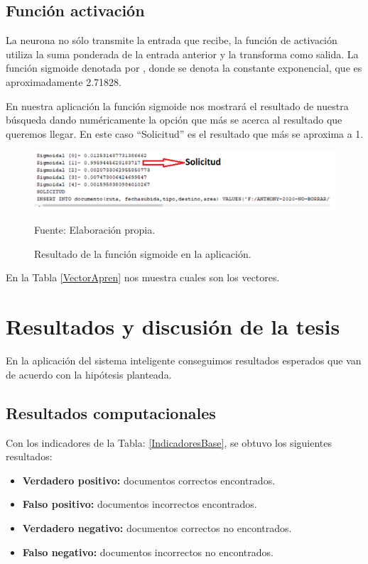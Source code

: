 \section{Función activación}
La neurona no sólo transmite la entrada que recibe, la función de activación utiliza la suma ponderada de la entrada anterior y la transforma como salida. La función sigmoide denotada por , donde se denota la constante exponencial, que es aproximadamente 2.71828.

En nuestra aplicación la función sigmoide nos mostrará el resultado de nuestra búsqueda dando numéricamente la opción que más se acerca al resultado que queremos llegar. En este caso ``Solicitud'' es el resultado que más se aproxima a 1.

\begin{figure}[h!]
	\centering
		\includegraphics[scale=0.8]{imagenes/ResultadoFunSigmoide.png}
		\caption{Resultado de la función sigmoide en la aplicación.}
		\begin{center}
    Fuente: Elaboración propia.
    \end{center}
	\label{fig:ResultadoFunSigmoide}
\end{figure}
En la Tabla \ref{VectorApren} nos muestra cuales son los vectores.
\newpage


\newpage


\chapter{Resultados y discusión de la tesis}

En la aplicación del sistema inteligente conseguimos resultados esperados que van de acuerdo con la hipótesis planteada.


\section{Resultados computacionales}
Con los indicadores de la Tabla: \ref{IndicadoresBase}, se obtuvo los siguientes resultados:
\begin{itemize}
\item \textbf{Verdadero positivo: }documentos correctos encontrados.
\item \textbf{Falso positivo: } documentos incorrectos encontrados.
\item \textbf{Verdadero negativo: } documentos correctos no encontrados.
\item \textbf{Falso negativo: } documentos incorrectos no encontrados.
\end{itemize}

